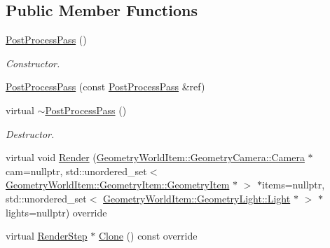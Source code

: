 \subsection*{Public Member Functions}
\begin{DoxyCompactItemize}
\item 
\mbox{\label{class_geometry_engine_1_1_geometry_render_step_1_1_post_process_pass_a258391904e3ae85a77f4bd471f15c60c}} 
\mbox{\hyperlink{class_geometry_engine_1_1_geometry_render_step_1_1_post_process_pass_a258391904e3ae85a77f4bd471f15c60c}{Post\+Process\+Pass}} ()
\begin{DoxyCompactList}\small\item\em Constructor. \end{DoxyCompactList}\item 
\mbox{\hyperlink{class_geometry_engine_1_1_geometry_render_step_1_1_post_process_pass_a79e267f8b485ebd55a9ac01ed0717f02}{Post\+Process\+Pass}} (const \mbox{\hyperlink{class_geometry_engine_1_1_geometry_render_step_1_1_post_process_pass}{Post\+Process\+Pass}} \&ref)
\item 
\mbox{\label{class_geometry_engine_1_1_geometry_render_step_1_1_post_process_pass_a638c1407f0a547b7b8c3b44914a7d6f7}} 
virtual \mbox{\hyperlink{class_geometry_engine_1_1_geometry_render_step_1_1_post_process_pass_a638c1407f0a547b7b8c3b44914a7d6f7}{$\sim$\+Post\+Process\+Pass}} ()
\begin{DoxyCompactList}\small\item\em Destructor. \end{DoxyCompactList}\item 
virtual void \mbox{\hyperlink{class_geometry_engine_1_1_geometry_render_step_1_1_post_process_pass_a2ebe2a0b940e47ccd10e649bff77138d}{Render}} (\mbox{\hyperlink{class_geometry_engine_1_1_geometry_world_item_1_1_geometry_camera_1_1_camera}{Geometry\+World\+Item\+::\+Geometry\+Camera\+::\+Camera}} $\ast$cam=nullptr, std\+::unordered\+\_\+set$<$ \mbox{\hyperlink{class_geometry_engine_1_1_geometry_world_item_1_1_geometry_item_1_1_geometry_item}{Geometry\+World\+Item\+::\+Geometry\+Item\+::\+Geometry\+Item}} $\ast$ $>$ $\ast$items=nullptr, std\+::unordered\+\_\+set$<$ \mbox{\hyperlink{class_geometry_engine_1_1_geometry_world_item_1_1_geometry_light_1_1_light}{Geometry\+World\+Item\+::\+Geometry\+Light\+::\+Light}} $\ast$ $>$ $\ast$lights=nullptr) override
\item 
virtual \mbox{\hyperlink{class_geometry_engine_1_1_geometry_render_step_1_1_render_step}{Render\+Step}} $\ast$ \mbox{\hyperlink{class_geometry_engine_1_1_geometry_render_step_1_1_post_process_pass_afcf20dc0a20cf1e0fb730c7b56071c26}{Clone}} () const override
\end{DoxyCompactItemize}
